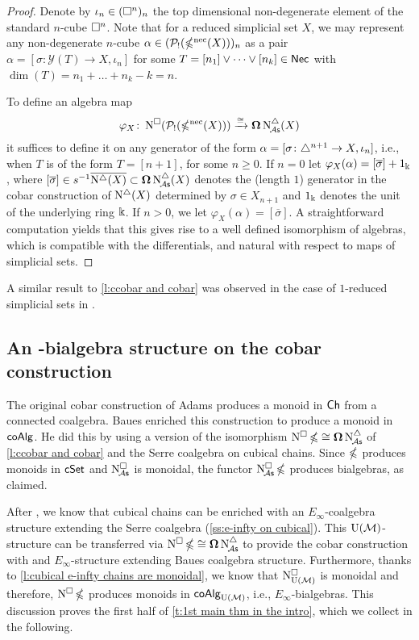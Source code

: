 \begin{proof}
	Denote by $\iota_n \in (\square^n)_n$ the top dimensional non-degenerate element of the standard $n$-cube $\square^n$.
	Note that for a reduced simplicial set $X$, we may represent any non-degenerate $n$-cube $\alpha \in (\mathcal{P}_!(\operatorname{\mathbb{\Omega}^{\mathrm{nec}}}(X)))_n$ as a pair $\alpha = [\sigma \colon \mathcal{Y}(T) \to X, \iota_n]$ for some $T = [n_1] \vee \dots \vee [n_k] \in \mathsf{Nec}$ with $\dim(T) = n_1 + \dots + n_k - k = n$.

	To define an algebra map
	\[
	\varphi_X \colon \operatorname{N^{\square}}(\mathcal{P}_!(\operatorname{\mathbb{\Omega}^{\mathrm{nec}}}(X))) \xrightarrow{\cong} \operatorname{\mathbf{\Omega}} \operatorname{N^{\triangle}_{\!{\mathcal{A}\mathsf{s}}}}(X)
	\]
	it suffices to define it on any generator of the form $\alpha=[\sigma \colon \triangle^{n+1} \to X, \iota_{n}]$, i.e., when $T$ is of the form $T = [n+1]$, for some $n \geq 0$.
	If $n = 0$ let $\varphi_X(\alpha)= [\overline{\sigma}] + 1_\Bbbk$, where $[\overline{\sigma}] \in s^{-1} \overline{ \operatorname{N^{\triangle}}(X)} \subset \operatorname{\mathbf{\Omega}} \operatorname{N^{\triangle}_{\!{\mathcal{A}\mathsf{s}}}}(X)$ denotes the (length $1$) generator in the cobar construction of $\operatorname{N^{\triangle}}(X)$ determined by $\sigma \in X_{n+1}$ and $1_\Bbbk$ denotes the unit of the underlying ring $\Bbbk$.
	If $n > 0$, we let $\varphi_X(\alpha)=[\overline{\sigma}]$.
	A straightforward computation yields that this gives rise to a well defined isomorphism of algebras, which is compatible with the differentials, and natural with respect to maps of simplicial sets.
\end{proof}
A similar result to \cref{l:ccobar and cobar} was observed in the case of $1$-reduced simplicial sets in \cite[Section~3.5]{berger1995loops}.

\subsection{An \pdfEinfty-bialgebra structure on the cobar construction} \label{ss:e-infty on cobar}

The original cobar construction of Adams produces a monoid in $\mathsf{Ch}$ from a connected coalgebra. Baues enriched this construction to produce a monoid in $\mathsf{coAlg}$.
He did this by using a version of the isomorphism $\operatorname{N^{\square}} \operatorname{\mathbb{\Omega}} \cong \operatorname{\mathbf{\Omega}} \operatorname{N^{\triangle}_{\!{\mathcal{A}\mathsf{s}}}}$ of \cref{l:ccobar and cobar} and the Serre coalgebra on cubical chains.
Since $\operatorname{\mathbb{\Omega}}$ produces monoids in $\mathsf{cSet}$ and $\operatorname{N^{\square}_{\!{\mathcal{A}\mathsf{s}}}}$ is monoidal, the functor $\operatorname{N^{\square}_{\!{\mathcal{A}\mathsf{s}}}} \operatorname{\mathbb{\Omega}}$ produces bialgebras, as claimed.

After \cite{medina2021cubical}, we know that cubical chains can be enriched with an $E_\infty$-coalgebra structure extending the Serre coalgebra (\cref{ss:e-infty on cubical}).
This ${\operatorname{U}(\mathcal{M})}$-structure can be transferred via $\operatorname{N^{\square}} \operatorname{\mathbb{\Omega}} \cong \operatorname{\mathbf{\Omega}} \operatorname{N^{\triangle}_{\!{\mathcal{A}\mathsf{s}}}}$ to provide the cobar construction with and $E_\infty$-structure extending Baues coalgebra structure.
Furthermore, thanks to \cref{l:cubical e-infty chains are monoidal}, we know that $\operatorname{N^{\square}_{{\operatorname{U}(\mathcal{M})}}}$ is monoidal and therefore, $\operatorname{N^{\square}} \operatorname{\mathbb{\Omega}}$ produces monoids in $\mathsf{coAlg}_{{\operatorname{U}(\mathcal{M})}}$, i.e., $E_\infty$-bialgebras.
This discussion proves the first half of \cref{t:1st main thm in the intro}, which we collect in the following.

